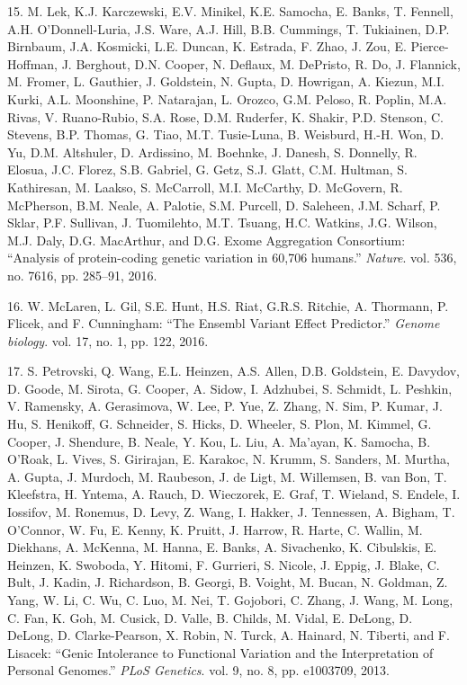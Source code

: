 \documentclass[12pt,twoside]{ugathesis}
\begin{document}
\hypertarget{ref-Lek2016}{}
15. M. Lek, K.J. Karczewski, E.V. Minikel, K.E. Samocha, E. Banks, T.
Fennell, A.H. O'Donnell-Luria, J.S. Ware, A.J. Hill, B.B. Cummings, T.
Tukiainen, D.P. Birnbaum, J.A. Kosmicki, L.E. Duncan, K. Estrada, F.
Zhao, J. Zou, E. Pierce-Hoffman, J. Berghout, D.N. Cooper, N. Deflaux,
M. DePristo, R. Do, J. Flannick, M. Fromer, L. Gauthier, J. Goldstein,
N. Gupta, D. Howrigan, A. Kiezun, M.I. Kurki, A.L. Moonshine, P.
Natarajan, L. Orozco, G.M. Peloso, R. Poplin, M.A. Rivas, V.
Ruano-Rubio, S.A. Rose, D.M. Ruderfer, K. Shakir, P.D. Stenson, C.
Stevens, B.P. Thomas, G. Tiao, M.T. Tusie-Luna, B. Weisburd, H.-H. Won,
D. Yu, D.M. Altshuler, D. Ardissino, M. Boehnke, J. Danesh, S. Donnelly,
R. Elosua, J.C. Florez, S.B. Gabriel, G. Getz, S.J. Glatt, C.M. Hultman,
S. Kathiresan, M. Laakso, S. McCarroll, M.I. McCarthy, D. McGovern, R.
McPherson, B.M. Neale, A. Palotie, S.M. Purcell, D. Saleheen, J.M.
Scharf, P. Sklar, P.F. Sullivan, J. Tuomilehto, M.T. Tsuang, H.C.
Watkins, J.G. Wilson, M.J. Daly, D.G. MacArthur, and D.G. Exome
Aggregation Consortium: ``Analysis of protein-coding genetic variation
in 60,706 humans.'' \emph{Nature}. vol. 536, no. 7616, pp. 285--91,
2016.

\hypertarget{ref-McLaren2016}{}
16. W. McLaren, L. Gil, S.E. Hunt, H.S. Riat, G.R.S. Ritchie, A.
Thormann, P. Flicek, and F. Cunningham: ``The Ensembl Variant Effect
Predictor.'' \emph{Genome biology}. vol. 17, no. 1, pp. 122, 2016.

\hypertarget{ref-Petrovski2013}{}
17. S. Petrovski, Q. Wang, E.L. Heinzen, A.S. Allen, D.B. Goldstein, E.
Davydov, D. Goode, M. Sirota, G. Cooper, A. Sidow, I. Adzhubei, S.
Schmidt, L. Peshkin, V. Ramensky, A. Gerasimova, W. Lee, P. Yue, Z.
Zhang, N. Sim, P. Kumar, J. Hu, S. Henikoff, G. Schneider, S. Hicks, D.
Wheeler, S. Plon, M. Kimmel, G. Cooper, J. Shendure, B. Neale, Y. Kou,
L. Liu, A. Ma'ayan, K. Samocha, B. O'Roak, L. Vives, S. Girirajan, E.
Karakoc, N. Krumm, S. Sanders, M. Murtha, A. Gupta, J. Murdoch, M.
Raubeson, J. de Ligt, M. Willemsen, B. van Bon, T. Kleefstra, H. Yntema,
A. Rauch, D. Wieczorek, E. Graf, T. Wieland, S. Endele, I. Iossifov, M.
Ronemus, D. Levy, Z. Wang, I. Hakker, J. Tennessen, A. Bigham, T.
O'Connor, W. Fu, E. Kenny, K. Pruitt, J. Harrow, R. Harte, C. Wallin, M.
Diekhans, A. McKenna, M. Hanna, E. Banks, A. Sivachenko, K. Cibulskis,
E. Heinzen, K. Swoboda, Y. Hitomi, F. Gurrieri, S. Nicole, J. Eppig, J.
Blake, C. Bult, J. Kadin, J. Richardson, B. Georgi, B. Voight, M. Bucan,
N. Goldman, Z. Yang, W. Li, C. Wu, C. Luo, M. Nei, T. Gojobori, C.
Zhang, J. Wang, M. Long, C. Fan, K. Goh, M. Cusick, D. Valle, B. Childs,
M. Vidal, E. DeLong, D. DeLong, D. Clarke-Pearson, X. Robin, N. Turck,
A. Hainard, N. Tiberti, and F. Lisacek: ``Genic Intolerance to
Functional Variation and the Interpretation of Personal Genomes.''
\emph{PLoS Genetics}. vol. 9, no. 8, pp. e1003709, 2013.


\end{document}
